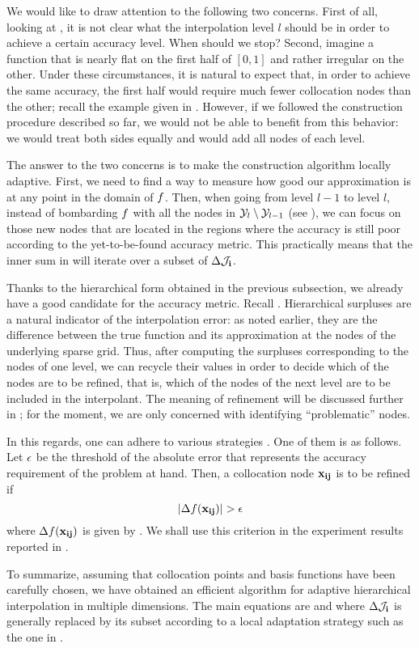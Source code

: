 We would like to draw attention to the following two concerns. First of all,
looking at , it is not clear what the interpolation
level $l$ should be in order to achieve a certain accuracy level. When should we
stop? Second, imagine a function that is nearly flat on the first half of $[0,
1]$ and rather irregular on the other. Under these circumstances, it is natural
to expect that, in order to achieve the same accuracy, the first half would
require much fewer collocation nodes than the other; recall the example given in
. However, if we followed the construction procedure described
so far, we would not be able to benefit from this behavior: we would treat both
sides equally and would add all nodes of each level.

The answer to the two concerns is to make the construction algorithm locally
adaptive. First, we need to find a way to measure how good our approximation is
at any point in the domain of $f$. Then, when going from level $l - 1$ to level
$l$, instead of bombarding $f$ with all the nodes in $\mathcal{Y}_l \setminus \mathcal{Y}_{l -
1}$ (see ), we can focus on those new nodes that
are located in the regions where the accuracy is still poor according to the
yet-to-be-found accuracy metric. This practically means that the inner sum in
 will iterate over a subset of $\Delta\mathcal{J}_{\mathbf{i}}$.

Thanks to the hierarchical form obtained in the previous subsection, we already
have a good candidate for the accuracy metric. Recall .
Hierarchical surpluses are a natural indicator of the interpolation error: as
noted earlier, they are the difference between the true function and its
approximation at the nodes of the underlying sparse grid. Thus, after computing
the surpluses corresponding to the nodes of one level, we can recycle their
values in order to decide which of the nodes are to be refined, that is, which
of the nodes of the next level are to be included in the interpolant. The
meaning of refinement will be discussed further in ; for
the moment, we are only concerned with identifying ``problematic'' nodes.

In this regards, one can adhere to various strategies \cite{ma2009}. One of them
is as follows. Let $\epsilon$ be the threshold of the absolute error that
represents the accuracy requirement of the problem at hand. Then, a collocation
node $\mathbf{x}_{\mathbf{i}\mathbf{j}}$ is to be refined if
\begin{equation} \elab{error}
  \left| \surplus(\vx_{\vi\vj}) \right| > \error
\end{equation}
where $\Delta f(\mathbf{x}_{\mathbf{i}\mathbf{j}})$ is given by . We shall use this
criterion in the experiment results reported in .

To summarize, assuming that collocation points and basis functions have been
carefully chosen, we have obtained an efficient algorithm for adaptive
hierarchical interpolation in multiple dimensions. The main equations are
 and  where $\Delta\mathcal{J}_{\mathbf{i}}$ is
generally replaced by its subset according to a local adaptation strategy such
as the one in .
